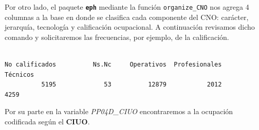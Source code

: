 \documentclass[
]{article}
\newenvironment{Shaded}{\begin{snugshade}}{\end{snugshade}}
\newcommand{\AttributeTok}[1]{\textcolor[rgb]{0.13,0.29,0.53}{#1}}
\newcommand{\FunctionTok}[1]{\textcolor[rgb]{0.13,0.29,0.53}{\textbf{#1}}}
\newcommand{\NormalTok}[1]{#1}
\newcommand{\OtherTok}[1]{\textcolor[rgb]{0.56,0.35,0.01}{#1}}
\newcommand{\SpecialCharTok}[1]{\textcolor[rgb]{0.81,0.36,0.00}{\textbf{#1}}}
\begin{document}
Por otro lado, el paquete \textbf{\texttt{eph}} mediante la función \texttt{organize\_CNO} nos agrega 4 columnas a la base en donde se clasifica cada componente del CNO: carácter, jerarquía, tecnología y calificación ocupacional. A continuación revisamos dicho comando y solicitaremos las frecuencias, por ejemplo, de la calificación.

\begin{Shaded}
\end{Shaded}

\begin{verbatim}

No calificados          Ns.Nc     Operativos  Profesionales       Técnicos 
          5195             53          12879           2012           4259 
\end{verbatim}

Por su parte en la variable \emph{PP04D\_CIUO} encontraremos a la ocupación codificada según el \textbf{CIUO}.

\begin{Shaded}
\end{Shaded}
\end{document}
